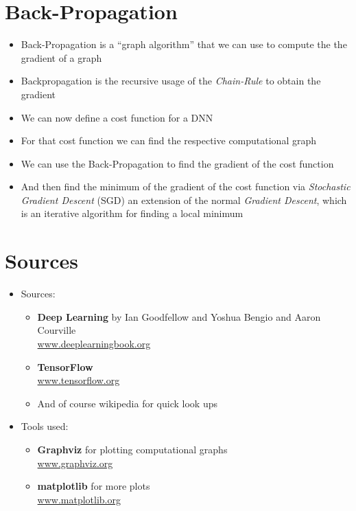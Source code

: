 \documentclass[t]{beamer} %
\begin{document}
\section{Back-Propagation}
\begin{frame}
    \begin{itemize}[<+->]
        \item Back-Propagation is a \enquote{graph algorithm} that we can use to compute the the gradient of a graph
        \item Backpropagation is the recursive usage of the \emph{Chain-Rule} to obtain the gradient \\
        \item We can now define a cost function for a DNN
        \item For that cost function we can find the respective computational graph
        \item We can use the Back-Propagation to find the gradient of the cost function
        \item And then find the minimum of the gradient of the cost function via \emph{Stochastic Gradient Descent} (SGD) an extension of the normal \emph{Gradient Descent}, which is an iterative algorithm for finding a local minimum
    \end{itemize}
\end{frame}

\section{Sources}
\begin{frame}
    \begin{itemize}[<+->]
        \item Sources:
        \begin{itemize}[<+->]
            \item \textbf{Deep Learning} by Ian Goodfellow and Yoshua Bengio and Aaron Courville \\
            \href{https://www.deeplearningbook.org}{www.deeplearningbook.org}
            \item \textbf{TensorFlow} \\
            \href{https://www.tensorflow.org}{www.tensorflow.org} \\

            \item And of course wikipedia for quick look ups
        \end{itemize}
        \item Tools used:
        \begin{itemize}[<+->]
            \item \textbf{Graphviz} for plotting computational graphs \\
            \href{https://graphviz.org}{www.graphviz.org}
            \item \textbf{matplotlib} for more plots \\
            \href{https://matplotlib.org}{www.matplotlib.org}
        \end{itemize}
    \end{itemize}
\end{frame}
\end{document}
